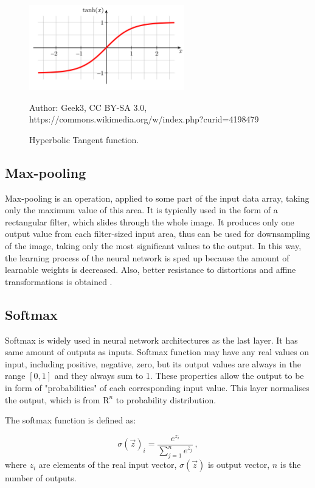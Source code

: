 \begin{figure}[!h]
  \centering
  \includegraphics[width=0.6\textwidth]{./fig/photos/hyperbolic_tangent.png}

  \caption{Hyperbolic Tangent function.}
  Author: Geek3, CC BY-SA 3.0, https://commons.wikimedia.org/w/index.php?curid=4198479
  \label{fig:htangent}
\end{figure}


\subsection{Max-pooling}

Max-pooling is an operation, applied to some part of the input data array, taking only the maximum value of this area. It is typically used in the form of a rectangular filter, which slides through the whole image. It produces only one output value from each filter-sized input area, thus can be used for downsampling of the image, taking only the most significant values to the output. In this way, the learning process of the neural network is sped up because the amount of learnable weights is decreased. Also, better resistance to distortions and affine transformations is obtained \cite{yu2014mixed}.

\subsection{Softmax}

Softmax is widely used in neural network architectures as the last layer. It has same amount of outputs as inputs. Softmax function may have any real values on input, including positive, negative, zero, but its output values are always in the range $[0, 1]$ and they always sum to 1. These properties allow the output to be in form of "probabilities" of each corresponding input value. This layer normalises the output, which is from $\textrm{R}^n$ to probability distribution.

The softmax function is defined as:

\begin{equation}
	\sigma(\vec z)_i = \frac{e^{z_i}}{\sum\limits_{j=1}^n e^{z_j}}\,,
\end{equation}
where $z_i$ are elements of the real input vector, $\sigma(\vec z)$ is output vector, $n$ is the number of outputs.


